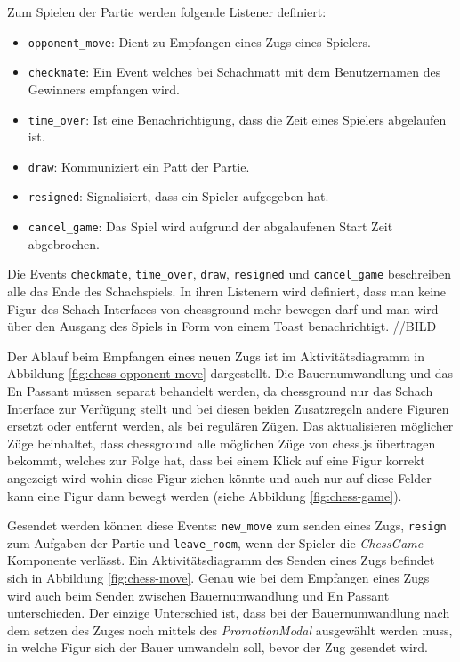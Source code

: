 Zum Spielen der Partie werden folgende Listener definiert:
\begin{itemize}
\item \verb|opponent_move|: Dient zu Empfangen eines Zugs eines Spielers.
\item \verb|checkmate|: Ein Event welches bei Schachmatt mit dem Benutzernamen des Gewinners empfangen wird.
\item \verb|time_over|: Ist eine Benachrichtigung, dass die Zeit eines Spielers abgelaufen ist.
\item \verb|draw|: Kommuniziert ein Patt der Partie.
\item \verb|resigned|: Signalisiert, dass ein Spieler aufgegeben hat.
\item \verb|cancel_game|: Das Spiel wird aufgrund der abgalaufenen Start Zeit abgebrochen.
\end{itemize}
Die Events \verb|checkmate|, \verb|time_over|, \verb|draw|, \verb|resigned| und \verb|cancel_game| beschreiben alle das Ende des Schachspiels. In ihren Listenern wird definiert, dass man keine Figur des Schach Interfaces von chessground mehr bewegen darf und man wird über den Ausgang des Spiels in Form von einem Toast benachrichtigt. //BILD

Der Ablauf beim Empfangen eines neuen Zugs ist im Aktivitätsdiagramm in Abbildung \ref{fig:chess-opponent-move} dargestellt. Die Bauernumwandlung und das En Passant müssen separat behandelt werden, da chessground nur das Schach Interface zur Verfügung stellt und bei diesen beiden Zusatzregeln andere Figuren ersetzt oder entfernt werden, als bei regulären Zügen. Das aktualisieren möglicher Züge beinhaltet, dass chessground alle möglichen Züge von chess.js übertragen bekommt, welches zur Folge hat, dass bei einem Klick auf eine Figur korrekt angezeigt wird wohin diese Figur ziehen könnte und auch nur auf diese Felder kann eine Figur dann bewegt werden (siehe Abbildung \ref{fig:chess-game}).

Gesendet werden können diese Events: \verb|new_move| zum senden eines Zugs, \verb|resign| zum Aufgaben der Partie und \verb|leave_room|, wenn der Spieler die \textit{ChessGame} Komponente verlässt.
Ein Aktivitätsdiagramm des Senden eines Zugs befindet sich in Abbildung \ref{fig:chess-move}. Genau wie bei dem Empfangen eines Zugs wird auch beim Senden zwischen Bauernumwandlung und En Passant unterschieden. Der einzige Unterschied ist, dass bei der Bauernumwandlung nach dem setzen des Zuges noch mittels des  \textit{PromotionModal} ausgewählt werden muss, in welche Figur sich der Bauer umwandeln soll, bevor der Zug gesendet wird.

